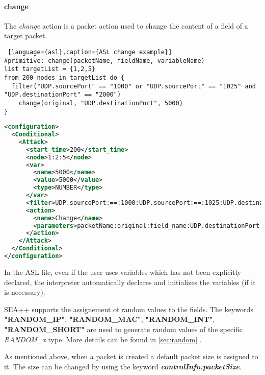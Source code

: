 \paragraph{change}
The \emph{change} action is a packet action used to change the content of a field of a target packet. 
%
\begin{lstlisting} [language={asl},caption={ASL change example}]
#primitive: change(packetName, fieldName, variableName)
list targetList = {1,2,5}
from 200 nodes in targetList do {
  filter("UDP.sourcePort" == "1000" or "UDP.sourcePort" == "1025" and "UDP.destinationPort" == "2000")
    change(original, "UDP.destinationPort", 5000)
}
\end{lstlisting}
%
\begin{lstlisting}[language={xml},caption={Interpreter output}]
<configuration>
  <Conditional>
    <Attack>
      <start_time>200</start_time>
      <node>1:2:5</node>
      <var>
        <name>5000</name>
        <value>5000</value>
        <type>NUMBER</type>
      </var>
      <filter>UDP.sourcePort:==:1000:UDP.sourcePort:==:1025:UDP.destinationPort:==:2000:AND:OR</filter>
      <action>
        <name>Change</name>
        <parameters>packetName:original:field_name:UDP.destinationPort:value:5000</parameters>
      </action>
    </Attack>
  </Conditional>
</configuration>
\end{lstlisting}
%
In the ASL file, even if the user uses variables which has not been explicitly declared, the interpreter automatically declares and initializes the variables (if it is necessary).

SEA++ supports the assignement of random values to the fields. The keywords \textbf{"RANDOM\_IP"}, \textbf{"RANDOM\_MAC"}, \textbf{"RANDOM\_INT"}, \textbf{"RANDOM\_SHORT"} are used to generate random values of the specific \emph{RANDOM\_x} type. More details can be found in \ref{sec:random} .

As mentioned above, when a packet is created a default packet size is assigned to it. The size can be changed by using the keyword \textbf{\emph{controlInfo.packetSize}}.

